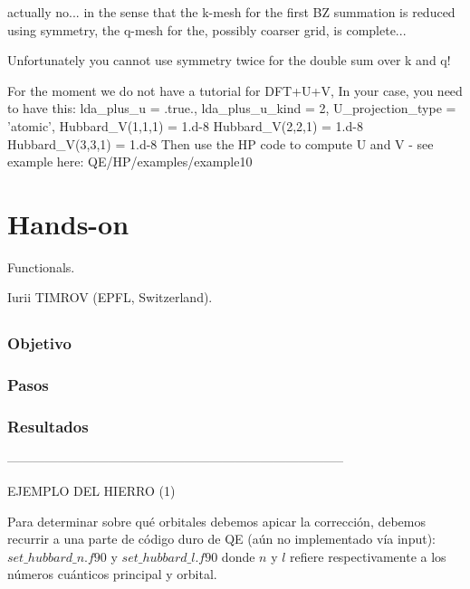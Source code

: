   actually no... in the sense that the k-mesh for the first BZ summation is reduced using symmetry, the q-mesh for the, possibly coarser grid, is complete...

  Unfortunately you cannot use symmetry twice for the double sum over k and q!


  For the moment we do not have a tutorial for DFT+U+V, In your case, you need to have this:
      lda\_plus\_u = .true.,
      lda\_plus\_u\_kind = 2,
      U\_projection\_type = 'atomic',
      Hubbard\_V(1,1,1) = 1.d-8
      Hubbard\_V(2,2,1) = 1.d-8
      Hubbard\_V(3,3,1) = 1.d-8
  Then use the HP code to compute U and V - see example here: QE/HP/examples/example10

\section{Hands-on}

 Functionals.

 Iurii TIMROV (EPFL, Switzerland).

\subsection{}

\subsubsection{Objetivo}

\subsubsection{Pasos}

\subsubsection{Resultados}

--------------------------------------------------------------------------------

EJEMPLO DEL HIERRO (1)

  Para determinar sobre qué orbitales debemos apicar la corrección, debemos recurrir a una parte de código duro de QE (aún no implementado vía input): $set\_hubbard\_n.f90$ y $set\_hubbard\_l.f90$ donde $n$ y $l$ refiere respectivamente a los números cuánticos principal y orbital.

